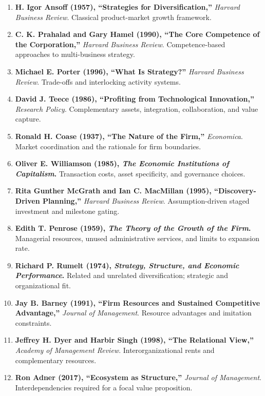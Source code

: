 \begin{enumerate}
    \item \textbf{H. Igor Ansoff (1957), ``Strategies for Diversification,''} \textit{Harvard Business Review}. Classical product-market growth framework.
    \item \textbf{C. K. Prahalad and Gary Hamel (1990), ``The Core Competence of the Corporation,''} \textit{Harvard Business Review}. Competence-based approaches to multi-business strategy.
    \item \textbf{Michael E. Porter (1996), ``What Is Strategy?''} \textit{Harvard Business Review}. Trade-offs and interlocking activity systems.
    \item \textbf{David J. Teece (1986), ``Profiting from Technological Innovation,''} \textit{Research Policy}. Complementary assets, integration, collaboration, and value capture.
    \item \textbf{Ronald H. Coase (1937), ``The Nature of the Firm,''} \textit{Economica}. Market coordination and the rationale for firm boundaries.
    \item \textbf{Oliver E. Williamson (1985), \textit{The Economic Institutions of Capitalism}.} Transaction costs, asset specificity, and governance choices.
    \item \textbf{Rita Gunther McGrath and Ian C. MacMillan (1995), ``Discovery-Driven Planning,''} \textit{Harvard Business Review}. Assumption-driven staged investment and milestone gating.
    \item \textbf{Edith T. Penrose (1959), \textit{The Theory of the Growth of the Firm}.} Managerial resources, unused administrative services, and limits to expansion rate.
    \item \textbf{Richard P. Rumelt (1974), \textit{Strategy, Structure, and Economic Performance}.} Related and unrelated diversification; strategic and organizational fit.
    \item \textbf{Jay B. Barney (1991), ``Firm Resources and Sustained Competitive Advantage,''} \textit{Journal of Management}. Resource advantages and imitation constraints.
    \item \textbf{Jeffrey H. Dyer and Harbir Singh (1998), ``The Relational View,''} \textit{Academy of Management Review}. Interorganizational rents and complementary resources.
    \item \textbf{Ron Adner (2017), ``Ecosystem as Structure,''} \textit{Journal of Management}. Interdependencies required for a focal value proposition.
\end{enumerate}

